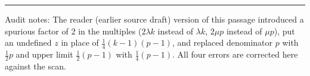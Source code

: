 \documentclass[11pt]{article}
\begin{document}
\bigskip
\hrule\medskip
\noindent\footnotesize Audit notes: The reader (earlier source draft) version of this passage
introduced a spurious factor of $2$ in the multiples ($2\lambda k$ instead of
$\lambda k$, $2\mu p$ instead of $\mu p$), put an undefined $z$ in place of
$\tfrac{1}{4}(k-1)(p-1)$, and replaced denominator $p$ with $\tfrac{1}{2}p$ and
upper limit $\tfrac{1}{2}(p-1)$ with $\tfrac{1}{4}(p-1)$. All four errors are
corrected here against the scan.
\end{document}

